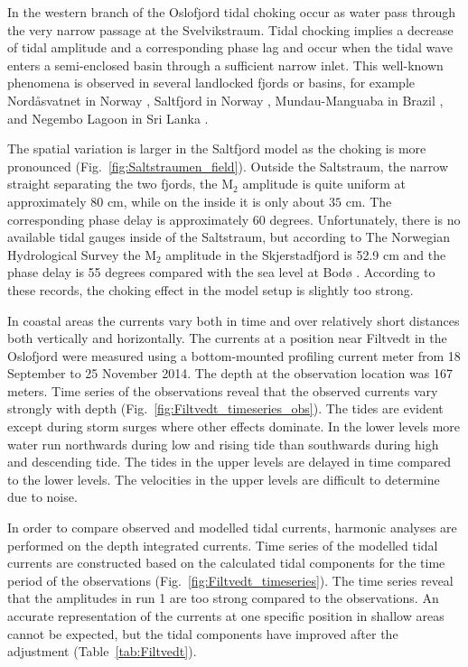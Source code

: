 In the western branch of the Oslofjord tidal choking occur as water pass through the very narrow passage at the Svelvikstraum. Tidal chocking implies a decrease of tidal amplitude and a corresponding phase lag \cite[]{stigebrandt80} and occur when the tidal wave enters a semi-enclosed basin through a sufficient narrow inlet. This well-known phenomena is observed in several landlocked fjords or basins, for example Nord{\aa}svatnet in Norway \cite[]{glenne63}, Saltfjord in Norway \cite[]{eliassen01}, Mundau-Manguaba in Brazil \cite[]{oliveira93}, and Negembo Lagoon in Sri Lanka \cite[]{rydberg96}. 

The spatial variation is larger in the Saltfjord model as the choking is more pronounced (Fig.~\ref{fig:Saltstraumen_field}). Outside the Saltstraum, the narrow straight separating the two fjords, the M$_2$ amplitude is quite uniform at approximately $80$ cm, while on the inside it is only about $35$ cm. The corresponding phase delay is approximately $60$ degrees. Unfortunately, there is no available tidal gauges inside of the Saltstraum, but according to The Norwegian Hydrological Survey the M$_2$ amplitude in the Skjerstadfjord is 52.9 cm and the phase delay is 55 degrees compared with the sea level at Bod{\o} \cite[]{tide16}.
According to these records, the choking effect in the model setup is slightly too strong.

In coastal areas the currents vary both in time and over relatively short distances both vertically and horizontally. The currents at a position near Filtvedt in the Oslofjord were measured using a bottom-mounted profiling current meter from 18 September to 25 November 2014. The depth at the observation location was 167 meters. Time series of the observations reveal that the observed currents vary strongly with depth (Fig.~\ref{fig:Filtvedt_timeseries_obs}). The tides are evident except during storm surges where other effects dominate. In the lower levels more water run northwards during low and rising tide than southwards during high and descending tide. The tides in the upper levels are delayed in time compared to the lower levels. The velocities in the upper levels are difficult to determine due to noise. 

In order to compare observed and modelled tidal currents, harmonic analyses are performed on the depth integrated currents. Time series of the modelled tidal currents are constructed based on the calculated tidal components for the time period of the observations (Fig.~\ref{fig:Filtvedt_timeseries}). The time series reveal that the amplitudes in run 1 are too strong compared to the observations. 
An accurate representation of the currents at one specific position in shallow areas cannot be expected, but the tidal components have improved after the adjustment (Table~\ref{tab:Filtvedt}). 


